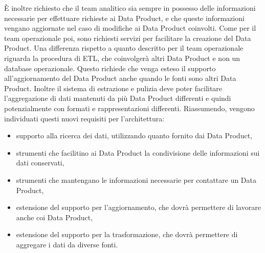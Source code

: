 \documentclass[a4paper,12pt]{report}
\begin{document}
È inoltre richiesto che il team analitico sia sempre in possesso delle informazioni necessarie per effettuare richieste ai Data Product, e che queste informazioni vengano aggiornate nel caso di modifiche ai Data Product coinvolti.
Come per il team operazionale poi, sono richiesti servizi per facilitare la creazione del Data Product. 
Una differenza rispetto a quanto descritto per il team operazionale riguarda la procedura di ETL, che coinvolgerà altri Data Product e non un database operazionale.
Questo richiede che venga esteso il supporto all'aggiornamento del Data Product anche quando le fonti sono altri Data Product. 
Inoltre il sistema di estrazione e pulizia deve poter facilitare l'aggregazione di dati mantenuti da più Data Product differenti e quindi potenzialmente con formati e rappresentazioni differenti.
Riassumendo, vengono individuati questi nuovi requisiti per l'architettura: 
\begin{itemize}
    \item supporto alla ricerca dei dati, utilizzando quanto fornito dai Data Product,
    \item strumenti che facilitino ai Data Product la condivisione delle informazioni sui dati conservati,
    \item strumenti che mantengano le informazioni necessarie per contattare un Data Product,
    \item estensione del supporto per l'aggiornamento, che dovrà permettere di lavorare anche coi Data Product,
    \item estensione del supporto per la trasformazione, che dovrà permettere  di aggregare i dati da diverse fonti.
\end{itemize}
\end{document}
